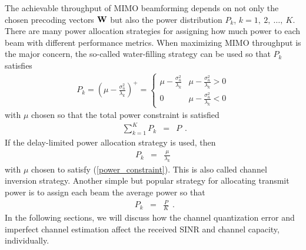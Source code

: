 \documentclass[10pt,fleqn, twocolumn]{IEEEtran}
\newcommand{\bW}{{\bf W}}
\begin{document}
The achievable throughput of MIMO beamforming depends on not only
the chosen precoding vectors $\bW$ but also the power distribution
$P_{k}$, $k=1,\ 2,\ \ldots,\ K$. There are many power allocation
strategies for assigning how much power to each beam with
different performance metrics. When maximizing MIMO throughput is
the major concern, the so-called water-filling strategy can be
used so that $P_{k}$ satisfies
\begin{equation}
\begin{array}{l}
P_{k}=\left(\mu-\frac{\sigma_{n}^2}{\lambda_{k}}\right)^{+}=
\begin{cases}
\mu-\frac{\sigma_{n}^2}{\lambda_{k}} & \mu-\frac{\sigma_{n}^2}{\lambda_{k}} >0 \\
0 & \mu-\frac{\sigma_{n}^2}{\lambda_{k}} < 0
\end{cases}
\end{array}
\end{equation}
with $\mu$ chosen so that the total power constraint is satisfied
\begin{equation}
\begin{array}{rcl}
\sum\limits_{k=1}^{K}P_{k}&=&P
\end{array}.\label{power_constraint}
\end{equation}
\noindent If the delay-limited power allocation strategy is used,
then
\begin{equation}
\begin{array}{rcl}
P_{k}&=&\frac{\mu}{\lambda_{k}}
\end{array}
\end{equation}
with $\mu$ chosen to satisfy (\ref{power_constraint}). This is
also called channel inversion strategy. Another simple but popular
strategy for allocating transmit power is to assign each beam the
average power so that
\begin{equation}
\begin{array}{rcl}
P_{k}&=&\frac{P}{K}
\end{array}.\label{P_aver}
\end{equation}
\noindent In the following sections, we will discuss how the
channel quantization error and imperfect channel estimation affect
the received SINR and channel capacity, individually.
\end{document}
